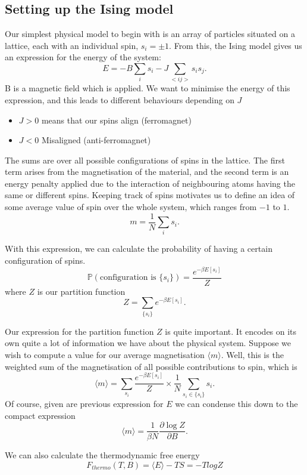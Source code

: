 \documentclass[11pt, oneside]{article}   	%
\begin{document}
\subsection{Setting up the Ising model}
Our simplest physical model to begin with is an array of particles situated on a lattice, each with an individual spin, $s_i = \pm 1 $. From this, the Ising model gives us an expression for the energy of the system:
\[ 
	E = - B \sum_i s_i - J \sum_{<ij>} s_i s_j. 
\]
B is a magnetic field which is applied. We want to minimise the energy of this expression, and this leads to different behaviours depending on $J$ 
\begin{itemize} 
	\item $J > 0$ means that our spins align (ferromagnet) 
	\item $J < 0$ Misaligned (anti-ferromagnet) 
\end{itemize}  
The sums are over all possible configurations of spins in the lattice. The first term arises from the magnetisation of the material, and the second term is an energy penalty applied due to the interaction of neighbouring atoms having the same or different spins. 
Keeping track of spins motivates us to define an idea of some average value of spin over the whole system, which ranges from $-1$ to $1$. 
\[
	m = \frac{1}{N} \sum_{i} s_i. 
\]


With this expression, we can calculate the probability of having a certain configuration of spins. 
\[
	\mathbb{P}(\text{configuration is } \{ s_i \}) = \frac{e^{ - \beta E[s_i]}}{Z}
\]
where $Z$ is our partition function 
\[ 
	Z = \sum_{\{ s_i \}} e^{ - \beta E[s_i] }. 
\]

Our expression for the partition function $Z$ is quite important. It encodes on its own quite a lot of information we have about the physical system. Suppose we wish to compute a value for our average magnetisation $\langle m \rangle$. Well, this is the weighted sum of the magnetisation of all possible contributions to spin, which is
\[ 
	 \langle m \rangle  = \sum_{s_i} \frac{e^{- \beta E[s_i]}}{Z} \times \frac{1}{N} \sum_{s_i \in \{ s_i\} } s_i. 
\] 
Of course, given are previous expression for $E$ we can condense this down to the compact expression 
\[ 
	\langle  m \rangle = \frac{1}{\beta N} \frac{\partial \log Z}{\partial B}. 
\] 

We can also calculate the thermodynamic free energy 
\[ 
	F_{thermo} (T, B)  = \langle E \rangle  - TS  = - T log Z 
\] 
\end{document}
